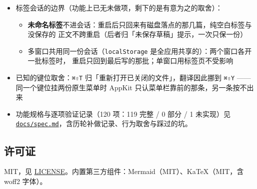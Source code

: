 \documentclass[11pt,a4paper]{ctexart}
\begin{document}
\begin{itemize}
\begin{itemize}
\item 藏起来的只有\textbf{行内标记与标题的 \texttt{\#\# }}。列表 \texttt{- } / \texttt{1. } 与引用 \texttt{\textgreater{} } 的前缀照原样
显示 —— 它们带缩进语义，藏了会失去「增删缩进」的锚点。
\item 编辑中形状变了（插进换行、\texttt{[}、\texttt{\$} 等）会当场退回源码态，不会拿渲染态硬扛。
\item 显示坐标不含标记而原文坐标含：选区跨过一段藏着的标记时，视觉上看不出少了几个
字符，但 \texttt{selectionStart/End} 读到的是原文偏移（与 textarea 一致）。
\end{itemize}
\item 标签会话的边界（功能上已无未做项，剩下的是有意为之的取舍）：
\begin{itemize}
\item \textbf{未命名标签}不进会话：重启后只回来有磁盘落点的那几篇，纯空白标签与没保存的
正文不跨重启（后者归「未保存草稿」提示，一次只保一份）
\item 多窗口共用同一份会话（\texttt{localStorage} 是全应用共享的）：两个窗口各开一批标签时，
重启只回到最后写的那批；单窗口用标签页不受影响
\end{itemize}
\item 已知的键位取舍：\texttt{⌘⇧T} 归「重新打开已关闭的文件」，翻译因此挪到 \texttt{⌘⇧Y}
—— 同一个键位挂两份原生菜单时 AppKit 只认菜单栏靠前的那条，另一条按不出来
\item 功能规格与逐项验证记录（120 项：119 完整 / 0 部分 / 1 未实现）见
\href{docs/spec.md}{\texttt{docs/spec.md}}，含历轮补做记录、行为取舍与踩过的坑。
\end{itemize}


\subsection{许可证}

MIT，见 \href{LICENSE}{LICENSE}。内置第三方组件：Mermaid（MIT）、KaTeX（MIT，含 woff2 字体）。
\end{document}

